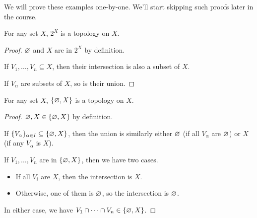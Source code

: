 We will prove these examples one-by-one.
We'll start skipping such proofs later in the course.

\begin{proposition}
    For any set $X$, $2^X$ is a topology on $X$.
\end{proposition}
\begin{proof}
    $\varnothing$ and $X$ are in $2^X$ by definition.

    If $V_1, \dots, V_n \subseteq X$, then their intersection is also
    a subset of $X$.

    If $V_\alpha$ are subsets of $X$, so is their union.
\end{proof}

\begin{proposition}
    For any set $X$, $\{\varnothing, X\}$ is a topology on $X$.
\end{proposition}
\begin{proof}
    $\varnothing, X \in \{\varnothing, X\}$ by definition.

    If $\{V_\alpha\}_{\alpha \in I} \subseteq \{\varnothing, X\}$,
    then the union is similarly either $\varnothing$ (if all $V_\alpha$ are $\varnothing$)
    or $X$ (if any $V_\alpha$ is $X$).

    If $V_1, \dots, V_n$ are in $\{\varnothing, X\}$, then we have two cases.
    \begin{itemize}
        \item If all $V_i$ are $X$, then the intersection is $X$.
        \item Otherwise, one of them is $\varnothing$, so the intersection is $\varnothing$.
    \end{itemize}
    In either case, we have $V_1 \cap \dots \cap V_n \in \{\varnothing, X\}$.
\end{proof}

